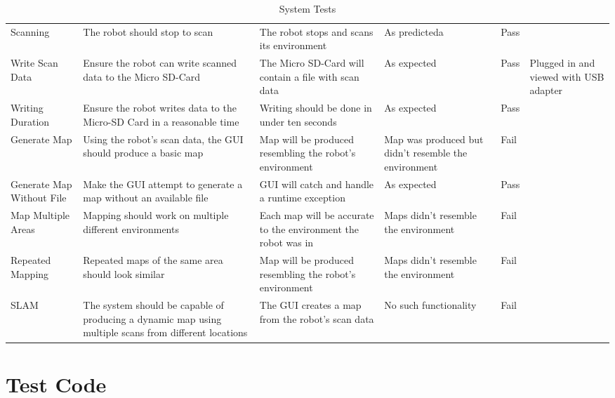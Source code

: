 \begin{appendices}
\begin{landscape}
\begin{table}[h!]
\begin{tabular}{| p{2.5cm} | p{5cm} | p{4cm} | p{4cm} | p{1.5cm} | p{2cm} |}
						Scanning & The robot should stop to scan & The robot stops and scans its environment & As predicteda & Pass &   \\ 
							
						Write Scan Data & Ensure the robot can write scanned data to the Micro SD-Card & The Micro SD-Card will contain a file with scan data & As expected & Pass & Plugged in and viewed with USB adapter  \\
							 
						Writing Duration & Ensure the robot writes data to the Micro-SD Card in a reasonable time  & Writing should be done in under ten seconds & As expected & Pass &   \\ 
							
						Generate Map & Using the robot's scan data, the GUI should produce a basic map & Map will be produced resembling the robot's environment & Map was produced but didn't resemble the environment & Fail &  \\ 
							
						Generate Map Without File & Make the GUI attempt to generate a map without an available file & GUI will catch and handle a runtime exception & As expected & Pass &  \\ 
							
						Map Multiple Areas & Mapping should work on multiple different environments & Each map will be accurate to the environment the robot was in & Maps didn't resemble the environment & Fail &  \\ 
							
						Repeated Mapping & Repeated maps of the same area should look similar & Map will be produced resembling the robot's environment & Maps didn't resemble the environment & Fail &  \\ 
							
						SLAM & The system should be capable of producing a dynamic map using multiple scans from different locations & The GUI creates a map from the robot's scan data & No such functionality & Fail &  \\ [1ex] 
							\hline
					\end{tabular}
				\caption{System Tests}
				\label{systemintergrationtestingtable}
				\end{table}
			\end{landscape}			

		\section{Test Code}
		\label{testing:testcode}

\end{appendices}
